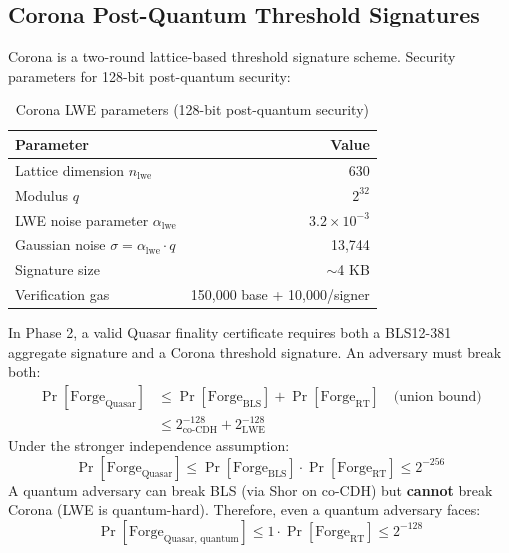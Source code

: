 \subsection{Corona Post-Quantum Threshold Signatures}

Corona \cite{corona} is a two-round lattice-based threshold signature scheme. Security parameters for 128-bit post-quantum security:

\begin{table}[h]
\centering
\begin{tabular}{lr}
\toprule
\textbf{Parameter} & \textbf{Value} \\
\midrule
Lattice dimension $n_{\text{lwe}}$ & 630 \\
Modulus $q$ & $2^{32}$ \\
LWE noise parameter $\alpha_{\text{lwe}}$ & $3.2 \times 10^{-3}$ \\
Gaussian noise $\sigma = \alpha_{\text{lwe}} \cdot q$ & 13,744 \\
Signature size & $\sim$4 KB \\
Verification gas & 150,000 base + 10,000/signer \\
\bottomrule
\end{tabular}
\caption{Corona LWE parameters (128-bit post-quantum security)}
\end{table}

\begin{theorem}
In Phase 2, a valid Quasar finality certificate requires both a BLS12-381 aggregate signature and a Corona threshold signature. An adversary must break both:
\begin{align}
\Pr[\text{Forge}_{\text{Quasar}}] &\leq \Pr[\text{Forge}_{\text{BLS}}] + \Pr[\text{Forge}_{\text{RT}}] \quad \text{(union bound)} \\
&\leq 2^{-128}_{\text{co-CDH}} + 2^{-128}_{\text{LWE}}
\end{align}
Under the stronger independence assumption:
\begin{equation}
\Pr[\text{Forge}_{\text{Quasar}}] \leq \Pr[\text{Forge}_{\text{BLS}}] \cdot \Pr[\text{Forge}_{\text{RT}}] \leq 2^{-256}
\end{equation}
A quantum adversary can break BLS (via Shor on co-CDH) but \textbf{cannot} break Corona (LWE is quantum-hard). Therefore, even a quantum adversary faces:
\begin{equation}
\Pr[\text{Forge}_{\text{Quasar, quantum}}] \leq 1 \cdot \Pr[\text{Forge}_{\text{RT}}] \leq 2^{-128}
\end{equation}
\end{theorem}

